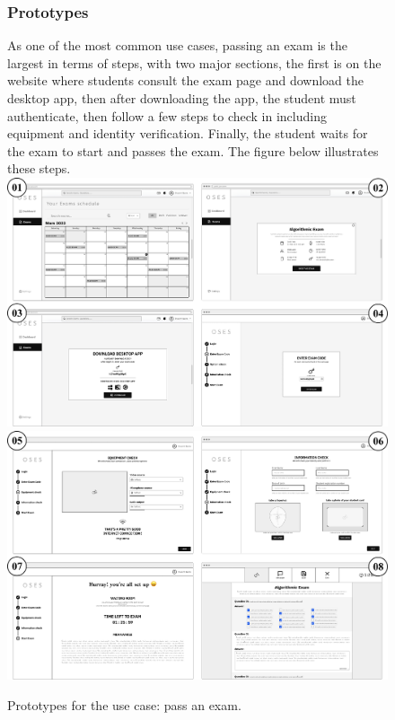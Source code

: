 \documentclass[]{uc2pfecaneva}
\begin{document}
    \begin{figure}
        \subsubsection{Prototypes}
        \raggedright As one of the most common use cases, passing an exam is the largest in terms of steps, with two major sections, the first is on the website where students consult the exam page and download the desktop app, then after downloading the app, the student must authenticate, then follow a few steps to check in including equipment and identity verification. Finally, the student waits for the exam to start and passes the exam. The figure below illustrates these steps.
        \linebreak
        \includegraphics[width=\textwidth]{images/prototypes_pass_exam1}
        \includegraphics[width=\textwidth]{images/prototypes_pass_exam2}
        \caption{Prototypes for the use case: pass an exam.}
    \end{figure}
    \clearpage
\end{document}
